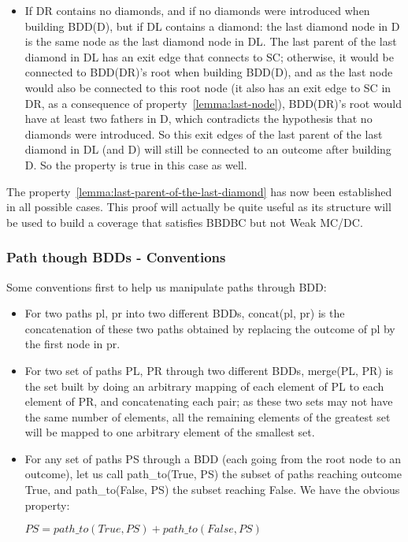 \documentclass[a4paper,12pt,twoside]{article}
\begin{document}
\begin{itemize}
\begin{itemize}
  \item If DR contains no diamonds, and if no diamonds were introduced
    when building BDD(D), but if DL contains a diamond: the last
    diamond node in D is the same node as the last diamond node in DL.
    The last parent of the last diamond in DL has an exit edge that
    connects to SC; otherwise, it would be connected to BDD(DR)'s root
    when building BDD(D), and as the last node would also be connected
    to this root node (it also has an exit edge to SC in DR, as a
    consequence of property~\ref{lemma:last-node}), BDD(DR)'s root
    would have at least two fathers in D, which contradicts the
    hypothesis that no diamonds were introduced. So this exit edges of
    the last parent of the last diamond in DL (and D) will still be
    connected to an outcome after building D. So the property is true
    in this case as well.
  \end{itemize}
\end{itemize}

The property~\ref{lemma:last-parent-of-the-last-diamond} has now been
established in all possible cases. This proof will actually be quite
useful as its structure will be used to build a coverage that satisfies
BBDBC but not Weak MC/DC.

\subsubsection{Path though BDDs - Conventions}

Some conventions first to help us manipulate paths through BDD:

\begin{itemize}
\item For two paths pl, pr into two different BDDs,
  concat(pl, pr) is the concatenation of these two paths obtained by replacing
  the outcome of pl by the first node in pr.

\item For two set of paths PL, PR through two different BDDs, merge(PL, PR)
  is the set built by doing an arbitrary mapping of each element
  of PL to each element of PR, and concatenating each pair; as these
  two sets may not have the same number of elements, all the remaining
  elements of the greatest set will be mapped to one arbitrary element
  of the smallest set.

\item For any set of paths PS through a BDD (each going from the root node to
  an outcome), let us call path\_to(True, PS) the subset of paths reaching
  outcome True, and path\_to(False, PS) the subset reaching False. We have
  the obvious property:

  $PS = path\_to(True, PS) + path\_to(False, PS)$
\end{itemize}
\end{document}
